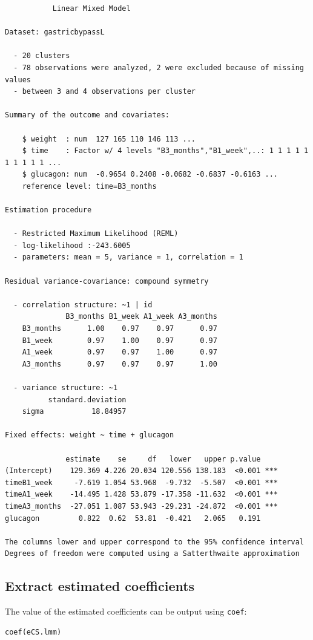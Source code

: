 \documentclass[12pt]{article}
\begin{document}
\begin{verbatim}
           Linear Mixed Model 
 
Dataset: gastricbypassL 

  - 20 clusters 
  - 78 observations were analyzed, 2 were excluded because of missing values 
  - between 3 and 4 observations per cluster 

Summary of the outcome and covariates: 

    $ weight  : num  127 165 110 146 113 ...
    $ time    : Factor w/ 4 levels "B3_months","B1_week",..: 1 1 1 1 1 1 1 1 1 1 ...
    $ glucagon: num  -0.9654 0.2408 -0.0682 -0.6837 -0.6163 ...
    reference level: time=B3_months 

Estimation procedure 

  - Restricted Maximum Likelihood (REML) 
  - log-likelihood :-243.6005
  - parameters: mean = 5, variance = 1, correlation = 1
 
Residual variance-covariance: compound symmetry 

  - correlation structure: ~1 | id 
              B3_months B1_week A1_week A3_months
    B3_months      1.00    0.97    0.97      0.97
    B1_week        0.97    1.00    0.97      0.97
    A1_week        0.97    0.97    1.00      0.97
    A3_months      0.97    0.97    0.97      1.00

  - variance structure: ~1 
          standard.deviation
    sigma           18.84957

Fixed effects: weight ~ time + glucagon 

              estimate    se     df   lower   upper p.value    
(Intercept)    129.369 4.226 20.034 120.556 138.183  <0.001 ***
timeB1_week     -7.619 1.054 53.968  -9.732  -5.507  <0.001 ***
timeA1_week    -14.495 1.428 53.879 -17.358 -11.632  <0.001 ***
timeA3_months  -27.051 1.087 53.943 -29.231 -24.872  <0.001 ***
glucagon         0.822  0.62  53.81  -0.421   2.065   0.191    

The columns lower and upper correspond to the 95% confidence interval
Degrees of freedom were computed using a Satterthwaite approximation
\end{verbatim}

\subsection{Extract estimated coefficients}
\label{sec:org49770f8}
The value of the estimated coefficients can be output using \texttt{coef}:
\lstset{language=r,label= ,caption= ,captionpos=b,numbers=none}
\begin{lstlisting}
coef(eCS.lmm)
\end{lstlisting}
\end{document}
